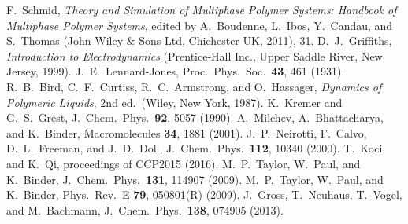 F.~Schmid, \emph{Theory and Simulation of Multiphase Polymer Systems:
Handbook of Multiphase Polymer Systems}, edited by A.~Boudenne, L.~Ibos,
Y.~Candau, and S.~Thomas (John Wiley \& Sons Ltd, Chichester UK, 2011), 31.
%
D.~J.~Griffiths, \emph{Introduction to Electrodynamics} (Prentice-Hall Inc., Upper Saddle River, New Jersey, 1999).
%
%
J.~E.~Lennard-Jones, Proc.\ Phys.\ Soc.\  \textbf{43}, 461 (1931).
%
%
R.~B.\ Bird, C.~F.\ Curtiss, R.~C.\ Armstrong, and O.~Hassager,
\emph{Dynamics of Polymeric Liquids}, 2nd ed.\ (Wiley, New York,
1987).
%
K.~Kremer and G.~S.\ Grest, J.~Chem.\ Phys.\ \textbf{92}, 5057 (1990).
%
A.~Milchev, A.~Bhattacharya, and K.~Binder, Macromolecules \textbf{34},
1881 (2001).
%
J.~P.~Neirotti, F.~Calvo, D.~L.~Freeman, and J.~D.~Doll, J.~Chem.\ Phys.\ \textbf{112}, 10340 (2000).
%
T.~Koci and K.~Qi, proceedings of CCP2015 (2016).
%
%
%
M.~P.~Taylor, W.~Paul, and K.~Binder, J.~Chem.~Phys.\ \textbf{131}, 114907
(2009).
%
M.~P.~Taylor, W.~Paul, and K.~Binder, Phys.\ Rev.~E \textbf{79}, 050801(R)
(2009).
%
J.~Gross, T.~Neuhaus, T.~Vogel, and M.~Bachmann, J.~Chem.\ Phys.\
\textbf{138}, 074905 (2013).






